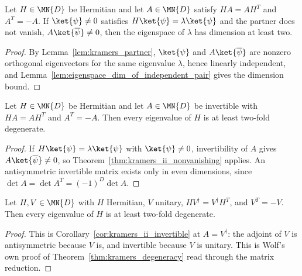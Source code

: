 \begin{theorem}
    \label{thm:kramers_ii_nonvanishing}
    \leanok
    Let $H\in\MN{D}$ be Hermitian and let $A\in\MN{D}$ satisfy $HA=AH^{T}$ and
    $A^{T}=-A$.  If $\ket{\psi}\neq0$ satisfies
    $H\ket{\psi}=\lambda\ket{\psi}$ and the partner does not vanish,
    $A\ket{\overline\psi}\neq0$, then the eigenspace of $\lambda$ has dimension
    at least two.
\end{theorem}

\begin{proof}\leanok
    By Lemma~\ref{lem:kramers_partner}, $\ket{\psi}$ and
    $A\ket{\overline\psi}$ are nonzero orthogonal eigenvectors for the same
    eigenvalue $\lambda$, hence linearly independent, and
    Lemma~\ref{lem:eigenspace_dim_of_independent_pair} gives the dimension
    bound.
\end{proof}

\begin{corollary}
    \label{cor:kramers_ii_invertible}
    \leanok
    Let $H\in\MN{D}$ be Hermitian and let $A\in\MN{D}$ be invertible with
    $HA=AH^{T}$ and $A^{T}=-A$.  Then every eigenvalue of $H$ is at least
    two-fold degenerate.
\end{corollary}

\begin{proof}\leanok
    If $H\ket{\psi}=\lambda\ket{\psi}$ with $\ket{\psi}\neq0$, invertibility
    of $A$ gives $A\ket{\overline\psi}\neq0$, so
    Theorem~\ref{thm:kramers_ii_nonvanishing} applies.  An antisymmetric
    invertible matrix exists only in even dimensions, since
    $\det A=\det A^{T}=(-1)^{D}\det A$.
\end{proof}

\begin{corollary}
    \label{cor:kramers_matrix_form}
    \leanok
    Let $H,V\in\MN{D}$ with $H$ Hermitian, $V$ unitary,
    $HV^{\dagger}=V^{\dagger}H^{T}$, and $V^{T}=-V$.  Then every eigenvalue of
    $H$ is at least two-fold degenerate.
\end{corollary}

\begin{proof}\leanok
    This is Corollary~\ref{cor:kramers_ii_invertible} at $A=V^{\dagger}$: the
    adjoint of $V$ is antisymmetric because $V$ is, and invertible because $V$
    is unitary.  This is Wolf's own proof of
    Theorem~\ref{thm:kramers_degeneracy} read through the matrix reduction.
\end{proof}
